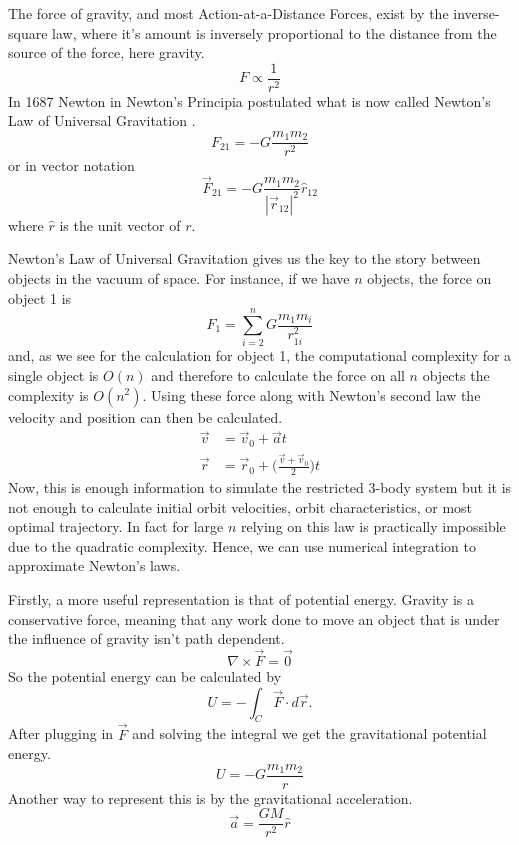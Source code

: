 \documentclass{article}
\begin{document}
The force of gravity, and most Action-at-a-Distance Forces, exist by the inverse-square law, where it's amount is inversely proportional to the distance from the source of the force, here gravity. $$F\propto \frac{1}{r^2}$$ In 1687 Newton in Newton's Principia postulated what is now called Newton's Law of Universal Gravitation \cite{rohrlich_1999}. $$F_{21}=-G\frac{m_1m_2}{r^2}$$ or in vector notation 
\begin{equation}
\vec{F}_{21}=-G\frac{m_1m_2}{|\vec{r}_{12}|^2}\hat{r}_{12}
\end{equation}
 where $\hat{r}$ is the unit vector of $r$.

Newton's Law of Universal Gravitation gives us the key to the story between objects in the vacuum of space. For instance, if we have $n$ objects, the force on object 1 is $$F_1=\sum_{i=2}^n{G\frac{m_1 m_i}{r_{1i}^2}}$$ and, as we see for the calculation for object 1, the computational complexity for a single object is $O(n)$ and therefore to calculate the force on all $n$ objects the complexity is $O(n^2)$. Using these force along with Newton's second law the velocity and position can then be calculated.
\begin{align}
	\vec{v} &= \vec{v}_0+\vec{a}t\\
	\vec{r} &= \vec{r}_0+\bigg(\frac{\vec{v}+\vec{v}_0}{2}\bigg)t
\end{align}
Now, this is enough information to simulate the restricted 3-body system but it is not enough to calculate initial orbit velocities, orbit characteristics, or most optimal trajectory. In fact for large $n$ relying on this law is practically impossible due to the quadratic complexity. Hence, we can use numerical integration to approximate Newton's laws.

Firstly, a more useful representation is that of potential energy. Gravity is a conservative force, meaning that any work done to move an object that is under the influence of gravity isn't path dependent. $$\nabla\times \vec{F}=\vec{0}$$ 
So the potential energy can be calculated by $$U=-\int_C \vec{F}\cdot d\vec{r}.$$ After plugging in $\vec{F}$ and solving the integral we get the gravitational potential energy.
\begin{equation}
U=-G\frac{m_1m_2}{r}
\end{equation}
Another way to represent this is by the gravitational acceleration. 
\begin{equation}
\vec{a}=\frac{GM}{r^2}\hat{r}
\end{equation}
\end{document}
